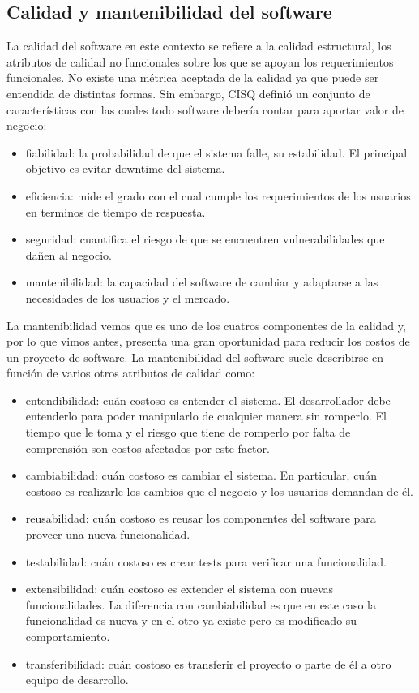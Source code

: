 \subsection{Calidad y mantenibilidad del software}
La calidad del software en este contexto se refiere a la calidad estructural, los atributos de calidad
no funcionales sobre los que se apoyan los requerimientos funcionales. No existe una métrica aceptada
de la calidad ya que puede ser entendida de distintas formas. Sin embargo, CISQ definió un conjunto de
características con las cuales todo software debería contar para aportar valor de negocio:

\begin{itemize}
    \item fiabilidad: la probabilidad de que el sistema falle, su estabilidad. El principal objetivo
    es evitar downtime del sistema.
    \item eficiencia: mide el grado con el cual cumple los requerimientos de los usuarios en
    terminos de tiempo de respuesta.
    \item seguridad: cuantifica el riesgo de que se encuentren vulnerabilidades que dañen al
    negocio.
    \item mantenibilidad: la capacidad del software de cambiar y adaptarse a las necesidades de los
    usuarios y el mercado.
\end{itemize}

La mantenibilidad vemos que es uno de los cuatros componentes de la calidad y, por lo que vimos
antes, presenta una gran oportunidad para reducir los costos de un proyecto de software. 
La mantenibilidad del software suele describirse en función de varios otros atributos de calidad como:

\begin{itemize}
    \item entendibilidad: cuán costoso es entender el sistema. El desarrollador debe entenderlo para
    poder manipularlo de cualquier manera sin romperlo. El tiempo que le toma y el riesgo que tiene
    de romperlo por falta de comprensión son costos afectados por este factor.
    \item cambiabilidad: cuán costoso es cambiar el sistema. En particular, cuán costoso es realizarle
    los cambios que el negocio y los usuarios demandan de él.
    \item reusabilidad: cuán costoso es reusar los componentes del software para proveer una nueva
    funcionalidad.
    \item testabilidad: cuán costoso es crear tests para verificar una funcionalidad.
    \item extensibilidad: cuán costoso es extender el sistema con nuevas funcionalidades. La diferencia
    con cambiabilidad es que en este caso la funcionalidad es nueva y en el otro ya existe pero es
    modificado su comportamiento.
    \item transferibilidad: cuán costoso es transferir el proyecto o parte de él a otro equipo de
    desarrollo.
\end{itemize}

